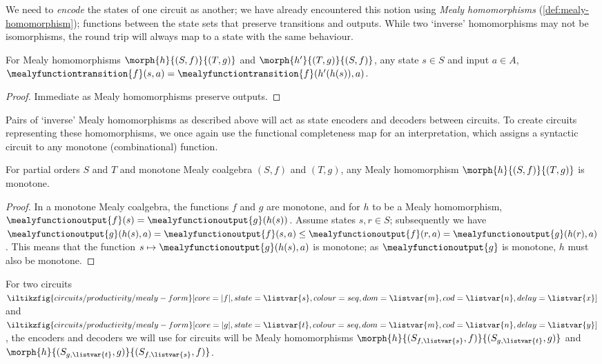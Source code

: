 We need to \emph{encode} the states of one circuit as another; we have already
encountered this notion using \emph{Mealy homomorphisms}
(\cref{def:mealy-homomorphism});
functions between the state sets that preserve transitions and outputs.
While two `inverse' homomorphisms may not be isomorphisms, the round
trip will always map to a state with the same behaviour.

\begin{lemma}
    For Mealy homomorphisms \(\morph{h}{(S,f)}{(T,g)}\) and
    \(\morph{h^\prime}{(T,g)}{(S,f)}\), any state \(s \in S\) and input
    \(a \in A\), \(
    \mealyfunctiontransition{f}(s, a)
    =
    \mealyfunctiontransition{f}(h^\prime(h(s)), a)
    \).
\end{lemma}
\begin{proof}
    Immediate as Mealy homomorphisms preserve outputs.
\end{proof}

Pairs of `inverse' Mealy homomorphisms as described above will act as state
encoders and decoders between circuits.
To create circuits representing these homomorphisms, we once again use the
functional completeness map for an interpretation, which assigns a syntactic
circuit to any monotone (combinational) function.

\begin{lemma}
    For partial orders \(S\) and \(T\) and monotone Mealy coalgebra
    \((S,f)\) and \((T,g)\), any Mealy homomorphism \(\morph{h}{(S,f)}{(T,g)}\)
    is monotone.
\end{lemma}
\begin{proof}
    In a monotone Mealy coalgebra, the functions \(f\) and \(g\) are monotone,
    and for \(h\) to be a Mealy homomorphism, \(
    \mealyfunctionoutput{f}(s)
    =
    \mealyfunctionoutput{g}(h(s))
    \).
    Assume states \(s,r \in S\); subsequently we have \(
    \mealyfunctionoutput{g}(h(s), a)
    =
    \mealyfunctionoutput{f}(s, a)
    \leq
    \mealyfunctionoutput{f}(r, a)
    =
    \mealyfunctionoutput{g}(h(r), a)
    \).
    This means that the function \(
    s \mapsto \mealyfunctionoutput{g}(h(s), a)
    \) is monotone; as \(\mealyfunctionoutput{g}\) is monotone, \(h\) must
    also be monotone.
\end{proof}

For two circuits \(
\iltikzfig{circuits/productivity/mealy-form}[core=|f|,state=\listvar{s},colour=seq,dom=\listvar{m},cod=\listvar{n},delay=\listvar{x}]
\) and \(
\iltikzfig{circuits/productivity/mealy-form}[core=|g|,state=\listvar{t},colour=seq,dom=\listvar{m},cod=\listvar{n},delay=\listvar{y}]
\), the encoders and decoders we will use for circuits will be Mealy homomorphisms
\(\morph{h}{(S_{f,\listvar{s}},f)}{(S_{g,\listvar{t}},g)}\)
and
\(\morph{h}{(S_{g,\listvar{t}},g)}{(S_{f,\listvar{s}},f)}\).


